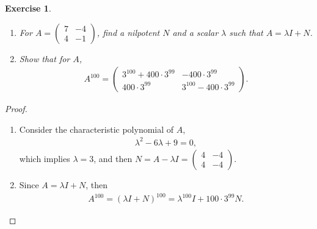 \documentclass[11pt]{book}
\newtheorem{exercise}{Exercise}[section]
\theoremstyle{definition}
\numberwithin{equation}{chapter}
\begin{document}
\begin{exercise}
~\begin{enumerate}[label=(\alph*)]
    \item For $A = \begin{pmatrix}
        7 & -4 \\
        4 & -1
    \end{pmatrix}$, find a nilpotent $N$ and a scalar $\lambda$ such that $A = \lambda I + N$.
    
    \item Show that for $A$, 
    \begin{align*}
        A^{100} = \begin{pmatrix}
        3^{100} + 400\cdot 3^{99} & -400 \cdot 3^{99} \\
        400 \cdot 3^{99} & 3^{100} - 400 \cdot 3^{99}
    \end{pmatrix}.
    \end{align*}
\end{enumerate}
\end{exercise}
\begin{proof}
~\begin{enumerate}[label=(\alph*)]
    \item Consider the characteristic polynomial of $A$,
    \begin{align*}
        \lambda^2 - 6 \lambda + 9 = 0,
    \end{align*}
    which implies $\lambda = 3$, and then $N = A - \lambda I = \begin{pmatrix}
        4 & -4 \\
        4 & -4
    \end{pmatrix}$.
    
    \item Since $A = \lambda I + N$, then
    \begin{align*}
        A^{100} = (\lambda I + N)^{100} = \lambda^{100}I + 100 \cdot 3^{99} N.
    \end{align*}
\end{enumerate}
\end{proof}

\medskip
\end{document}
